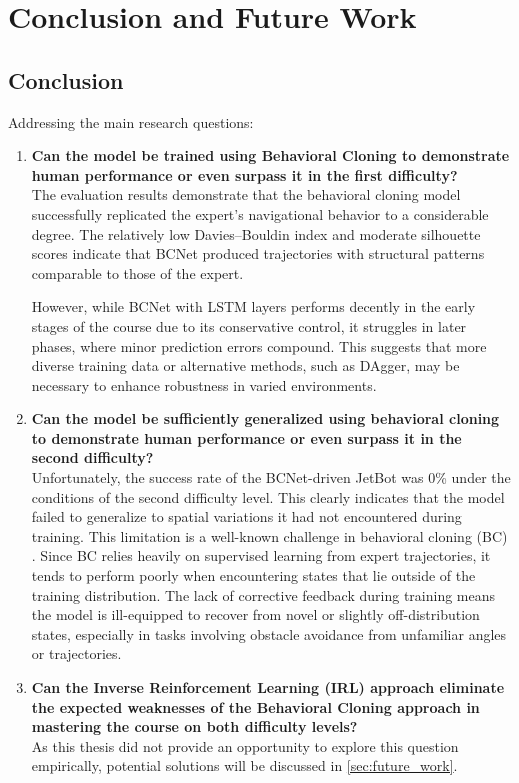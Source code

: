 \chapter{Conclusion and Future Work}
\label{cha:Conclusion}

\section{Conclusion}

Addressing the main research questions:

\begin{enumerate}
  \item \textbf{Can the model be trained using Behavioral Cloning to demonstrate human performance or even surpass it in the first difficulty?} \\
    The evaluation results demonstrate that the behavioral cloning model successfully replicated the expert’s navigational behavior to a considerable degree. The relatively low Davies–Bouldin index and moderate silhouette scores indicate that BCNet produced trajectories with structural patterns comparable to those of the expert.

    However, while BCNet with LSTM layers performs decently in the early stages of the course due to its conservative control, it struggles in later phases, where minor prediction errors compound. This suggests that more diverse training data or alternative methods, such as DAgger, may be necessary to enhance robustness in varied environments.

  \item \textbf{Can the model be sufficiently generalized using behavioral cloning to demonstrate human performance or even surpass it in the second difficulty?} \\
    Unfortunately, the success rate of the BCNet-driven JetBot was 0\% under the conditions of the second difficulty level. This clearly indicates that the model failed to generalize to spatial variations it had not encountered during training. This limitation is a well-known challenge in behavioral cloning (BC) \autocite{NIPS1988_812b4ba2}. Since BC relies heavily on supervised learning from expert trajectories, it tends to perform poorly when encountering states that lie outside of the training distribution. The lack of corrective feedback during training means the model is ill-equipped to recover from novel or slightly off-distribution states, especially in tasks involving obstacle avoidance from unfamiliar angles or trajectories.

  \item \textbf{Can the Inverse Reinforcement Learning (IRL) approach eliminate the expected weaknesses of the Behavioral Cloning approach in mastering the course on both difficulty levels?} \\
    As this thesis did not provide an opportunity to explore this question empirically, potential solutions will be discussed in \autoref{sec:future_work}.
\end{enumerate}

